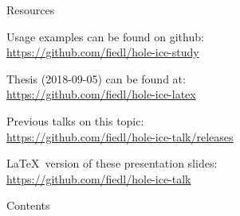 
\begin{frame}{Resources}
  \begin{center}
    Usage examples can be found on github: \\ \vspace{0.2cm}
    \url{https://github.com/fiedl/hole-ice-study}

    \vspace{1cm}

    Thesis (2018-09-05) can be found at: \\ \vspace{0.2cm}
    \url{https://github.com/fiedl/hole-ice-latex}

    \vspace{1cm}

    Previous talks on this topic: \\ \vspace{0.2cm}
    \url{https://github.com/fiedl/hole-ice-talk/releases}

    \vspace{1cm}

    \LaTeX\ version of these presentation slides: \\ \vspace{0.2cm}
    \url{https://github.com/fiedl/hole-ice-talk}
  \end{center}
\end{frame}

\begin{frame}{Contents}

  \tableofcontents[subsectionstyle=show]


\end{frame}

